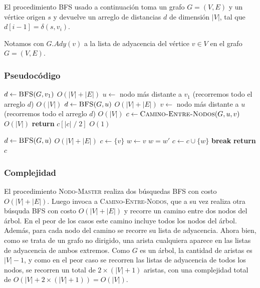 \documentclass[a4paper, 10pt, twoside]{article}
\newenvironment{pseudo}[1][]{%
    \vspace{1em}%
    \begin{algorithmic}%
}
{%
    \end{algorithmic}%
    \vspace{1em}%
}
\newcommand{\In}{\textbf{in} }
\newcommand{\Break}{\State \textbf{break}}
\newcommand{\PReturn}{\State \textbf{return} }
\newcommand{\Ode}[1]{\hfill $O(#1)$}
\begin{document}
El procedimiento BFS usado a continuación toma un grafo $G = (V, E)$ y un vértice origen $s$ y devuelve un arreglo de distancias $d$ de dimensión $|V|$, tal que $d[i - 1] = \delta(s, v_i)$.

Notamos con $G.Ady(v)$ a la lista de adyacencia del vértice $v \in V$ en el grafo $G = (V, E)$.


\subsubsection{Pseudocódigo}

\begin{pseudo}
    \State $d \leftarrow \textsc{BFS}(G, v_1)$                                         \Ode{|V| + |E|}
    \State $u \leftarrow$ nodo más distante a $v_1$ (recorremos todo el arreglo $d$)   \Ode{|V|}
    \State $d \leftarrow \textsc{BFS}(G, u)$                                           \Ode{|V| + |E|}
    \State $v \leftarrow$ nodo más distante a $u$ (recorremos todo el arreglo $d$)     \Ode{|V|}
    \State $c \leftarrow \textsc{Camino-Entre-Nodos}(G, u, v)$                         \Ode{|V|}
    \PReturn $c[|c|\; /\; 2]$                                                          \Ode{1}
  \EndProcedure

  \State

    \State $d \leftarrow \textsc{BFS}(G, u)$                                           \Ode{|V| + |E|}
    \State $c \leftarrow \{ v \}$ 
    \State $w \leftarrow v$ 
     
      \For{$w'$ \In $G.Ady(w)$} 
         
          \State $w = w'$
          \State $c \leftarrow c \cup \{ w \}$ 
          \Break
        \EndIf
      \EndFor
    \EndWhile
    \PReturn $c$
  \EndProcedure
\end{pseudo}


\subsubsection{Complejidad}

El procedimiento \textsc{Nodo-Master} realiza dos búsquedas BFS con costo $O(|V| + |E|)$. Luego invoca a \textsc{Camino-Entre-Nodos}, que a su vez realiza otra búsquda BFS con costo $O(|V| + |E|)$ y recorre un camino entre dos nodos del árbol. En el peor de los casos este camino incluye todos los nodos del árbol. Además, para cada nodo del camino se recorre su lista de adyacencia. Ahora bien, como se trata de un grafo no dirigido, una arista cualquiera aparece en las listas de adyacencia de ambos extremos. Como $G$ es un árbol, la cantidad de aristas es $|V| - 1$, y como en el peor caso se recorren las listas de adyacencia de todos los nodos, se recorren un total de $2 \times (|V| + 1)$ aristas, con una complejidad total de $O(|V| + 2 \times (|V| + 1)) = O(|V|)$.
\end{document}
